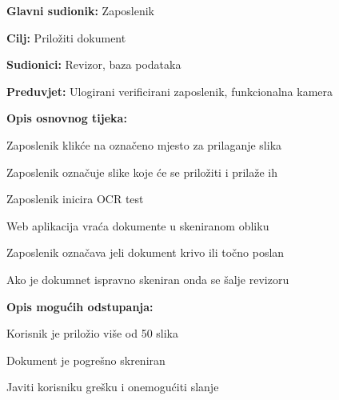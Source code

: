 				\noindent {}
				\begin{packed_item}
					
					\item \textbf{Glavni sudionik:} Zaposlenik
					\item  \textbf{Cilj:} Priložiti dokument
					\item  \textbf{Sudionici:} Revizor, baza podataka
					\item  \textbf{Preduvjet:} Ulogirani verificirani zaposlenik, funkcionalna kamera
					\item  \textbf{Opis osnovnog tijeka:}
					
					\item[] \begin{packed_enum}
						
						\item Zaposlenik klikće na označeno mjesto za prilaganje slika
						\item Zaposlenik označuje slike koje će se priložiti i prilaže ih
						\item Zaposlenik inicira OCR test
						\item Web aplikacija vraća dokumente u skeniranom obliku
						\item Zaposlenik označava jeli dokument krivo ili točno poslan
						\item Ako je dokumnet ispravno skeniran onda se šalje revizoru
					\end{packed_enum}
					
					\item  \textbf{Opis mogućih odstupanja:}
					
					\item[] \begin{packed_item}
						
						\item[2.a] Korisnik je priložio više od 50 slika
						\item[2.b] Dokument je pogrešno skreniran
						\item[] \begin{packed_enum}
							
							\item Javiti korisniku grešku i onemogućiti slanje
							
						\end{packed_enum}
						
					\end{packed_item}
				\end{packed_item}
				
